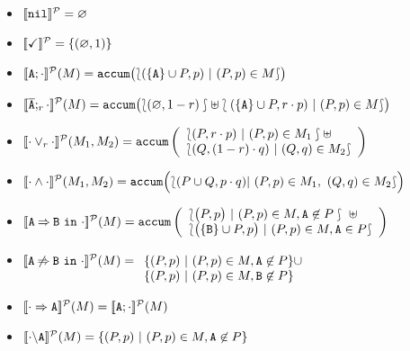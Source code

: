   \begin{itemize}

  \item $[\![\mathtt{nil}]\!]^{\cal P}=\varnothing$

  \item $[\![\checkmark]\!]^{\cal P}=\{(\varnothing,1)\}$

  \item
    $[\![\mathtt{A};\cdot]\!]^{\cal P}(M)=
      \mathtt{accum}\bigl(\lbag(\{\mathtt{A}\}\cup P,p)\ |\ (P,p)\in M\rbag\bigr)
         $

  \item
    $[\![\overline{\mathtt{A}};_{r}\cdot]\!]^{\cal P}(M)=
                \mathtt{accum}\bigl(\lbag(\varnothing , 1-r )\rbag\uplus\lbag (\{\mathtt{A}\}\cup P, r\cdot p ) \ |\ (P,p) \in M\rbag\bigr)$

  \item
    $[\![\cdot\mathbin{\lor}_{r}\cdot]\!]^{\cal P}(M_{1},M_{2})=\mathtt{accum}
    \left(\begin{array}{l}
    \lbag(P,r\cdot p  ) \ |\ (P,p) \in M_{1}\rbag \uplus\\ 
    \lbag(Q, (1-r)\cdot q  ) \ |\ (Q,q) \in M_{2}\rbag
    \end{array}\right) $
  \item
    $
        [\![\cdot\mathbin{\wedge}\cdot]\!]^{\cal P}(M_{1},M_{2})= \mathtt{accum}\Bigl(
                \lbag (P\cup Q, p\cdot q)  |\ (P,p) \in M_{1},\ (Q,q) \in M_{2}\rbag\Bigr)
    $

  \item
    $[\![\mathtt{A}\mathbin{\Rightarrow}\mathtt{B}\ \mathtt{in}\ \cdot]\!]^{\cal P}(M)=\mathtt{accum}\left(\begin{array}{l}
      \lbag\bigl(P,p\bigr)\ |\  (P,p)\in M, \mathtt{A}\not\in P\rbag\ \uplus\\
      \lbag\bigl(\{\mathtt{B}\}\cup P ,p\bigr)\ |\ (P,p)\in M, \mathtt{A}\in P\rbag \\
      \end{array}\right)$

  \item
    $[\![\mathtt{A}\mathbin{\not\Rightarrow}\mathtt{B}\ \mathtt{in}\ \cdot]\!]^{\cal P}(M)=\begin{array}[t]{l}
      \{(P,p)\ |\ (P,p)\in M, \mathtt{A}\not\in P\}\cup\\
      \{(P,p)\ |\ (P,p)\in M, \mathtt{B}\not\in P\}
      \end{array}$

    \item $[\![\cdot\Rightarrow\mathtt{A}]\!]^{\cal P}(M) = [\![\mathtt{A};{\cdot}]\!]^{\cal P}(M)$

    \item
      $[\![\cdot\backslash\mathtt{A}]\!]^{\cal P}(M) = \{(P,p)\ |\ (P, p) \in M, \mathtt{A}\not\in P      \}$

  \end{itemize}
\edfn


